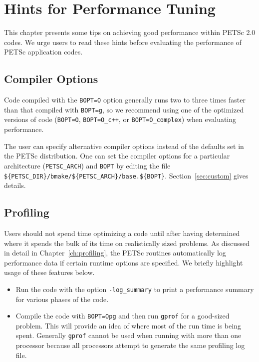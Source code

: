 {%
\chapter{Hints for Performance Tuning} 
\label{ch:performance} 

This chapter presents some tips on achieving good performance within
PETSc 2.0 codes.  We urge users to read these hints before
evaluating the performance of PETSc application codes.

\section{Compiler Options}

Code compiled with the {\tt BOPT=O} option generally runs two to three times
faster than that compiled with {\tt BOPT=g}, so we recommend using one
of the optimized versions of code ({\tt BOPT=O}, {\tt BOPT=O\_c++}, or
{\tt BOPT=O\_complex}) when evaluating performance.

The user can specify alternative compiler options instead of
the defaults set in the PETSc distribution.  One can set
the compiler options for a particular architecture
({\tt PETSC\_ARCH}) and {\tt BOPT} by editing the file
{\tt \$\{PETSC\_DIR\}/bmake/\$\{PETSC\_ARCH\}/base.\$\{BOPT\}}.
Section~\ref{sec:custom} gives details.

\section{Profiling}
  

Users should not spend time optimizing a code until after having determined
where it spends the bulk of its time on realistically sized problems.
As discussed in detail in Chapter~\ref{ch:profiling}, the PETSc
routines automatically log performance data if certain runtime options
are specified.  We briefly highlight usage of these features below.

\begin{itemize}
\item Run the code with the option {\tt -log\_summary} to print a performance
   summary for various phases of the code. 

\item Compile the code with {\tt BOPT=Opg} and then run {\tt gprof} for a good-sized 
   problem.  This will provide an idea of where most of the run time is being spent. 
   Generally {\tt gprof} cannot be used when running with more than one processor because
   all processors attempt to generate the same profiling log file.


\end{itemize}}
